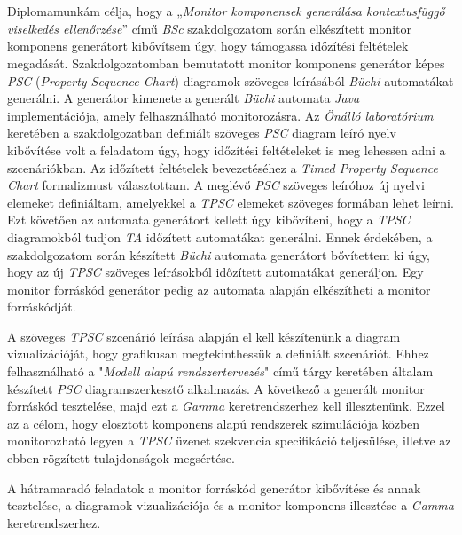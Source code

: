\chapter{\bevezetes}
Diplomamunkám célja, hogy a „\textit{Monitor komponensek generálása kontextusfüggő viselkedés ellenőrzése}” \cite{Bakai} című \textit{BSc} szakdolgozatom során elkészített monitor komponens generátort kibővítsem úgy, hogy támogassa időzítési feltételek megadását.
Szakdolgozatomban bemutatott monitor komponens generátor képes \textit{PSC} (\textit{Property Sequence Chart}) \cite{PSC1} diagramok szöveges leírásából \textit{Büchi} \cite{PSC1} automatákat generálni.
A generátor kimenete a generált \textit{Büchi} automata \textit{Java} implementációja, amely felhasználható monitorozásra.
Az \textit{Önálló laboratórium} keretében a szakdolgozatban definiált szöveges \textit{PSC} diagram leíró nyelv kibővítése volt a feladatom úgy, hogy időzítési feltételeket is meg lehessen adni a szcenáriókban.
Az időzített feltételek bevezetéséhez a \textit{Timed Property Sequence Chart} \cite{TPSC1} formalizmust választottam.
A meglévő \textit{PSC} szöveges leíróhoz új nyelvi elemeket definiáltam, amelyekkel a \textit{TPSC} elemeket szöveges formában lehet leírni.
Ezt követően az automata generátort kellett úgy kibővíteni, hogy a \textit{TPSC} diagramokból tudjon \textit{TA} időzített automatákat \cite{TPSC1} generálni.
Ennek érdekében, a szakdolgozatom során készített \textit{Büchi} automata generátort bővítettem ki úgy, hogy az új \textit{TPSC} szöveges leírásokból időzített automatákat generáljon.
Egy monitor forráskód generátor pedig az automata alapján elkészítheti a monitor forráskódját.

A szöveges \textit{TPSC} szcenárió leírása alapján el kell készítenünk a diagram vizualizációját, hogy grafikusan megtekinthessük a definiált szcenáriót.
Ehhez felhasználható a "\textit{Modell alapú rendszertervezés}" című tárgy keretében általam készített \textit{PSC} diagramszerkesztő alkalmazás.
A következő a generált monitor forráskód tesztelése, majd ezt a \textit{Gamma} keretrendszerhez \cite{Gamma} kell illesztenünk.
Ezzel az a célom, hogy elosztott komponens alapú rendszerek szimulációja közben monitorozható legyen a \textit{TPSC} üzenet szekvencia specifikáció teljesülése, illetve az ebben rögzített tulajdonságok megsértése.

A hátramaradó feladatok a monitor forráskód generátor kibővítése és annak tesztelése, a diagramok vizualizációja és a monitor komponens illesztése a \textit{Gamma} keretrendszerhez.

